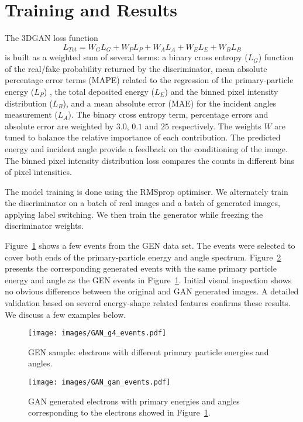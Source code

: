 \section{Training and Results}
The 3DGAN loss function
\begin{equation}
   L_{Tot}  = W_{G}L_{G} + W_{P}L_{P} + W_{A}L_{A} + W_{E}L_{E} + W_{B}L_{B} 
\label{eq:loss}
\end{equation}
is built as a weighted sum of several terms: a binary cross entropy ($L_{G}$) function of the real/fake probability returned by the discriminator, mean absolute percentage error terms (MAPE) related to the regression of the primary-particle energy ($L_{P}$) , the total deposited energy ($L_{E}$) and the binned pixel intensity distribution ($L_{B}$), and a mean absolute error (MAE) for the incident angles measurement ($L_{A}$). The binary cross entropy term, percentage errors and absolute error are weighted by $3.0$, $0.1$ and $25$ respectively. The weights $W$ are tuned to balance the relative importance of each contribution. The predicted energy and incident angle provide a feedback on the conditioning of the image. The binned pixel intensity distribution loss compares the counts in different bins of pixel intensities. 

The model training is done using the RMSprop \cite{rmsProp} optimiser. We alternately train the discriminator on a batch of real images and a batch of generated images, applying label switching. We then train the generator while freezing the discriminator weights.

Figure~\ref{fig:GEANT4_events} shows a few events from the GEN data set. The events were selected to cover both ends of the primary-particle energy and angle spectrum. Figure~\ref{fig:GAN_events} presents the corresponding generated events with the same primary particle energy and angle as the GEN events in Figure~\ref{fig:GEANT4_events}. Initial visual inspection shows no obvious difference between the original and GAN generated images. A detailed validation based on several energy-shape related features confirms these results. We discuss a few examples below.

\begin{figure}[htbp]
    \texttt{[image: images/GAN\_g4\_events.pdf]}
    \caption{GEN sample: electrons with different primary particle energies and angles.}
    \label{fig:GEANT4_events}
\end{figure}

\begin{figure}[htbp]
    \texttt{[image: images/GAN\_gan\_events.pdf]}
    \caption{GAN generated electrons with primary energies and angles corresponding to the electrons showed in Figure~\ref{fig:GEANT4_events}.}
    \label{fig:GAN_events}
\end{figure}

